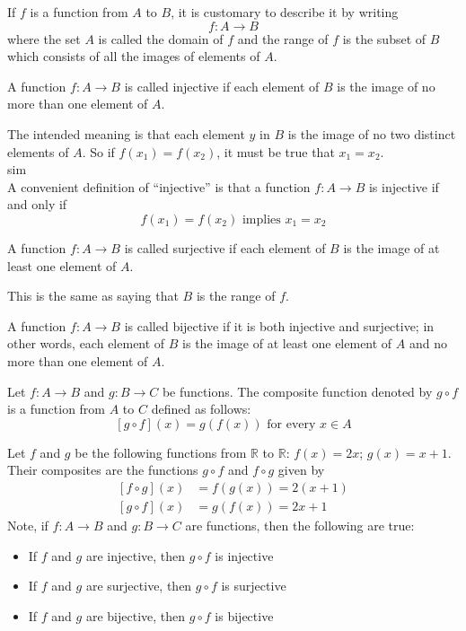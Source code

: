 \documentclass[12pt]{article}
\newcommand{\reals}{\mathds{R}}
\begin{document}
\begin{definition} If $f$ is a function from $A$ to $B$, it is customary to describe it by writing $$f: A \to B$$ where the set $A$ is called the domain of $f$ and the range of $f$ is the subset of $B$ which consists of all the images of elements of $A$. \end{definition} 

\begin{definition} A function $f: A \to B$ is called injective if each element of $B$ is the image of no more than one element of $A$. \end{definition} 
The intended meaning is that each element $y$ in $B$ is the image of no two distinct elements of $A$. So if $f(x_1) = f(x_2)$, it must be true that $x_1 = x_2$. \\sim\\
A convenient definition of ``injective'' is that a function $f: A \to B$ is injective if and only if $$f(x_1) = f(x_2) \text{ implies } x_1 = x_2 $$ 

\begin{definition} A function $f: A \to B$ is called surjective if each element of $B$ is the image of at least one element of $A$. \end{definition} This is the same as saying that $B$ is the range of $f$. 

\begin{definition} A function $f: A \to B$ is called bijective if it is both injective and surjective; in other words, each element of $B$ is the image of at least one element of $A$ and no more than one element of $A$. \end{definition} 

\begin{definition} Let $f: A \to B$ and $g: B \to C$ be functions. The composite function denoted by $g \circ f$ is a function from $A$ to $C$ defined as follows: $$[g \circ f](x) = g(f(x)) \text{ for every } x \in A$$ \end{definition} 

\begin{example} Let $f$ and $g$ be the following functions from $\reals$ to $\reals$: $f(x) = 2x$; $g(x) = x+1$. Their composites are the functions $g \circ f$ and $f \circ g$ given by $$ \begin{aligned} [f \circ g](x) &= f(g(x)) = 2(x + 1) \\ [g \circ f](x) &= g(f(x)) = 2x + 1 \end{aligned} $$ 
Note, if $f: A \to B$ and $g: B \to C$ are functions, then the following are true: \begin{itemize} 
\item If $f$ and $g$ are injective, then $g \circ f$ is injective
\item If $f$ and $g$ are surjective, then $g \circ f$ is surjective 
\item If $f$ and $g$ are bijective, then $g \circ f$ is bijective \end{itemize} \end{example}
\end{document}
